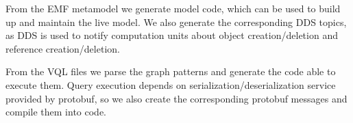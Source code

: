 From the EMF metamodel we generate model code, which can be used to build up and maintain the live model. 
We also generate the corresponding DDS topics, as DDS is used to notify computation units about object creation/deletion and reference creation/deletion.

From the VQL files we parse the graph patterns and generate the code able to execute them.
Query execution depends on serialization/deserialization service provided by protobuf, so we also create the corresponding protobuf messages and compile them into \cpp{} code.
